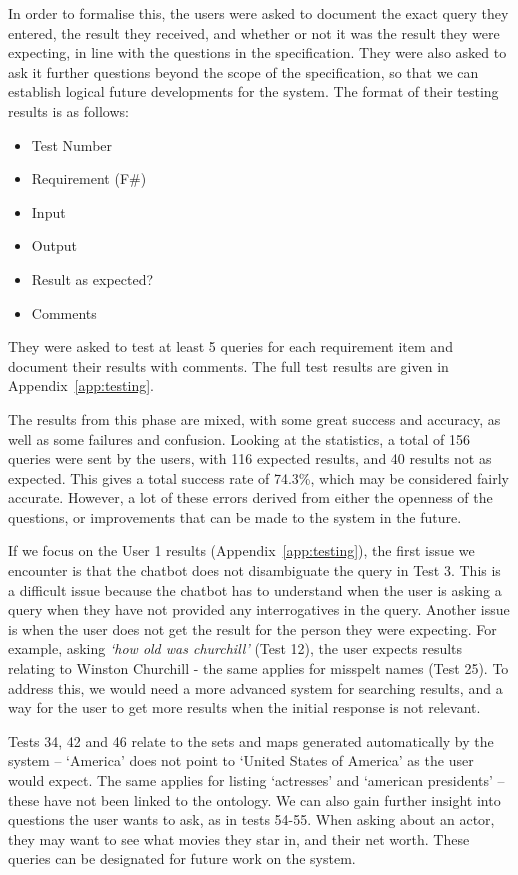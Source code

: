 In order to formalise this, the users were asked to document the exact query they entered, the result they received, and whether or not it was the result they were expecting, in line with the questions in the specification. They were also asked to ask it further questions beyond the scope of the specification, so that we can establish logical future developments for the system. The format of their testing results is as follows:
\begin{itemize}
	\item Test Number
	\item Requirement (F\#)
	\item Input
	\item Output
	\item Result as expected?
	\item Comments
\end{itemize}
They were asked to test at least 5 queries for each requirement item and document their results with comments. The full test results are given in Appendix~\ref{app:testing}.

The results from this phase are mixed, with some great success and accuracy, as well as some failures and confusion. Looking at the statistics, a total of 156 queries were sent by the users, with 116 expected results, and 40 results not as expected. This gives a total success rate of 74.3\%, which may be considered fairly accurate. However, a lot of these errors derived from either the openness of the questions, or improvements that can be made to the system in the future.

If we focus on the User 1 results (Appendix~\ref{app:testing}), the first issue we encounter is that the chatbot does not disambiguate the query in Test 3. This is a difficult issue because the chatbot has to understand when the user is asking a query when they have not provided any interrogatives in the query. Another issue is when the user does not get the result for the person they were expecting. For example, asking {\it`how old was churchill'} (Test 12), the user expects results relating to Winston Churchill - the same applies for misspelt names (Test 25). To address this, we would need a more advanced system for searching results, and a way for the user to get more results when the initial response is not relevant.

Tests 34, 42 and 46 relate to the sets and maps generated automatically by the system -- `America' does not point to `United States of America' as the user would expect. The same applies for listing `actresses' and `american presidents' -- these have not been linked to the ontology. We can also gain further insight into questions the user wants to ask, as in tests 54-55. When asking about an actor, they may want to see what movies they star in, and their net worth. These queries can be designated for future work on the system.

